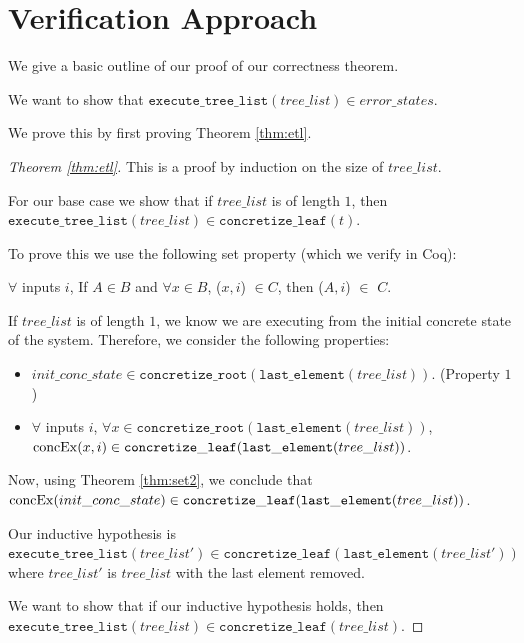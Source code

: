 \section{Verification Approach}
We give a basic outline of our proof of our correctness theorem.

We want to show that $\mathtt{execute\_tree\_list} (tree\_list) \in error\_states$.

We prove this by first proving Theorem \ref{thm:etl}.

\begin{proof}[Theorem \ref{thm:etl}]
This is a proof by induction on the size of $tree\_list$.

For our base case we show that if $tree\_list$ is of length $1$, then $\mathtt{execute\_tree\_list} (tree\_list) \in \mathtt{concretize\_leaf} (t)$.


To prove this we use the following set property (which we verify in Coq):

\begin{theorem}
$\forall$ inputs $i$,
If $A \in B$ and 
$\forall x \in B$, \concexecution($x, i$) $\in C$, then  \concexecution($A, i$) $\in$ $C$.
\label{thm:set2}
\end{theorem}

If $tree\_list$ is of length $1$, we know we are executing from the initial concrete state of the system. Therefore, we consider the following properties:
\begin{itemize}
\item $init\_conc\_state \in 
  \mathtt{concretize\_root} (\mathtt{last\_element} (tree\_list))$. (Property $1$)
 \item $ \forall$ inputs $i$, 
 $\forall x \in
  \mathtt{concretize\_root} (\mathtt{last\_element} (tree\_list))$,  
 $ \mathrm{concEx}(x, i) \in \mathtt{concretize\_leaf}(\mathtt{last\_element}(tree\_list))$.
\end{itemize}

Now, using Theorem \ref{thm:set2}, we conclude that $\mathrm{concEx}(init\_conc\_state) \in \mathtt{concretize\_leaf}(\mathtt{last\_element}(tree\_list))$.

Our inductive hypothesis is  $\mathtt{execute\_tree\_list} (tree\_list') \in \mathtt{concretize\_leaf} (\mathtt{last\_element}(tree\_list'))$ where $tree\_list'$ is $tree\_list$ with the last element removed.

We want to show that if our inductive hypothesis holds, then $\mathtt{execute\_tree\_list} (tree\_list) \in \mathtt{concretize\_leaf}(tree\_list)$.


\end{proof}
